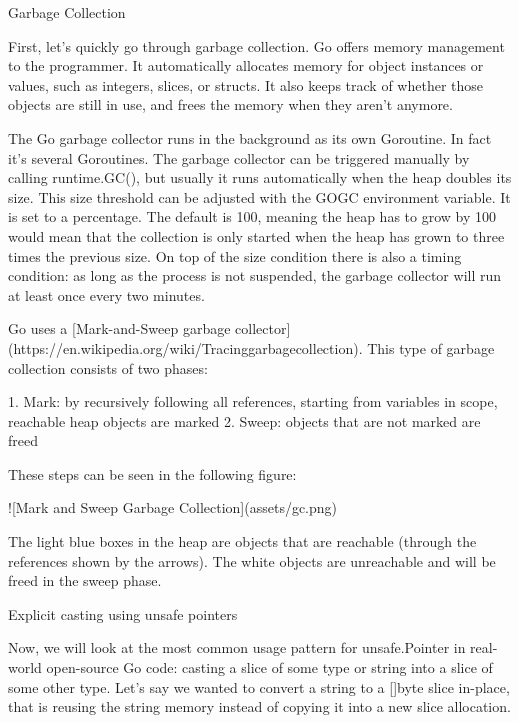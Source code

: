         Garbage Collection

        First, let's quickly go through garbage collection. Go offers memory management to the programmer. It automatically
        allocates memory for object instances or values, such as integers, slices, or structs. It also keeps track of whether
        those objects are still in use, and frees the memory when they aren't anymore.

        The Go garbage collector runs in the background as its own Goroutine. In fact it's several Goroutines. The garbage
        collector can be triggered manually by calling runtime.GC(), but usually it runs automatically when the heap doubles
        its size. This size threshold can be adjusted with the GOGC environment variable. It is set to a percentage. The
        default is 100, meaning the heap has to grow by 100%
        would mean that the collection is only started when the heap has grown to three times the previous size. On top of the
        size condition there is also a timing condition: as long as the process is not suspended, the garbage collector will run
        at least once every two minutes.

        Go uses a [Mark-and-Sweep garbage collector](https://en.wikipedia.org/wiki/Tracinggarbagecollection). This type of
        garbage collection consists of two phases:

        1. Mark: by recursively following all references, starting from variables in scope, reachable heap objects are marked
        2. Sweep: objects that are not marked are freed

        These steps can be seen in the following figure:

        ![Mark and Sweep Garbage Collection](assets/gc.png)

        The light blue boxes in the heap are objects that are reachable (through the references shown by the arrows). The white
        objects are unreachable and will be freed in the sweep phase.


        Explicit casting using unsafe pointers

        Now, we will look at the most common usage pattern for unsafe.Pointer in real-world open-source Go code: casting a
        slice of some type or string into a slice of some other type. Let's say we wanted to convert a string to a []byte
        slice in-place, that is reusing the string memory instead of copying it into a new slice allocation.

